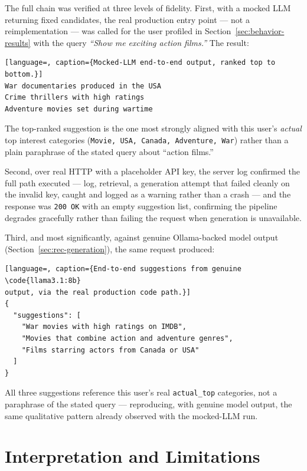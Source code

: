 \documentclass[11pt,a4paper,oneside]{book}
\newcommand{\code}[1]{\texttt{#1}}
\begin{document}
The full chain was verified at three levels of fidelity. First, with a mocked LLM returning fixed
candidates, the real production entry point --- not a reimplementation --- was called for the
user profiled in Section~\ref{sec:behavior-results} with the query \emph{``Show me exciting action
films.''} The result:

\begin{lstlisting}[language=, caption={Mocked-LLM end-to-end output, ranked top to bottom.}]
War documentaries produced in the USA
Crime thrillers with high ratings
Adventure movies set during wartime
\end{lstlisting}

The top-ranked suggestion is the one most strongly aligned with this user's \emph{actual} top
interest categories (\code{Movie, USA, Canada, Adventure, War}) rather than a plain paraphrase of
the stated query about ``action films.''

Second, over real HTTP with a placeholder API key, the server log confirmed the full path executed
--- log, retrieval, a generation attempt that failed cleanly on the invalid key, caught and logged
as a warning rather than a crash --- and the response was \code{200 OK} with an empty suggestion
list, confirming the pipeline degrades gracefully rather than failing the request when generation is
unavailable.

Third, and most significantly, against genuine Ollama-backed model output (Section~\ref{sec:rec-generation}),
the same request produced:

\begin{lstlisting}[language=, caption={End-to-end suggestions from genuine \code{llama3.1:8b}
output, via the real production code path.}]
{
  "suggestions": [
    "War movies with high ratings on IMDB",
    "Movies that combine action and adventure genres",
    "Films starring actors from Canada or USA"
  ]
}
\end{lstlisting}

All three suggestions reference this user's real \code{actual\_top} categories, not a paraphrase of
the stated query --- reproducing, with genuine model output, the same qualitative pattern already
observed with the mocked-LLM run.

\section{Interpretation and Limitations}
\label{sec:rec-limits}
\end{document}
